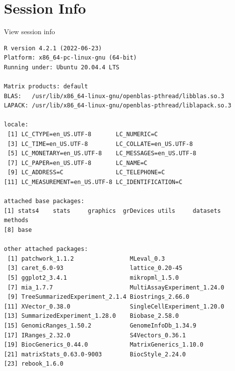 \documentclass[
]{book}
\begin{document}
\hypertarget{session-info-8}{%
\section*{Session Info}\label{session-info-8}}

View session info

\begin{verbatim}
R version 4.2.1 (2022-06-23)
Platform: x86_64-pc-linux-gnu (64-bit)
Running under: Ubuntu 20.04.4 LTS

Matrix products: default
BLAS:   /usr/lib/x86_64-linux-gnu/openblas-pthread/libblas.so.3
LAPACK: /usr/lib/x86_64-linux-gnu/openblas-pthread/liblapack.so.3

locale:
 [1] LC_CTYPE=en_US.UTF-8       LC_NUMERIC=C              
 [3] LC_TIME=en_US.UTF-8        LC_COLLATE=en_US.UTF-8    
 [5] LC_MONETARY=en_US.UTF-8    LC_MESSAGES=en_US.UTF-8   
 [7] LC_PAPER=en_US.UTF-8       LC_NAME=C                 
 [9] LC_ADDRESS=C               LC_TELEPHONE=C            
[11] LC_MEASUREMENT=en_US.UTF-8 LC_IDENTIFICATION=C       

attached base packages:
[1] stats4    stats     graphics  grDevices utils     datasets  methods  
[8] base     

other attached packages:
 [1] patchwork_1.1.2                MLeval_0.3                    
 [3] caret_6.0-93                   lattice_0.20-45               
 [5] ggplot2_3.4.1                  mikropml_1.5.0                
 [7] mia_1.7.7                      MultiAssayExperiment_1.24.0   
 [9] TreeSummarizedExperiment_2.1.4 Biostrings_2.66.0             
[11] XVector_0.38.0                 SingleCellExperiment_1.20.0   
[13] SummarizedExperiment_1.28.0    Biobase_2.58.0                
[15] GenomicRanges_1.50.2           GenomeInfoDb_1.34.9           
[17] IRanges_2.32.0                 S4Vectors_0.36.1              
[19] BiocGenerics_0.44.0            MatrixGenerics_1.10.0         
[21] matrixStats_0.63.0-9003        BiocStyle_2.24.0              
[23] rebook_1.6.0                  


\end{verbatim}
\end{document}

